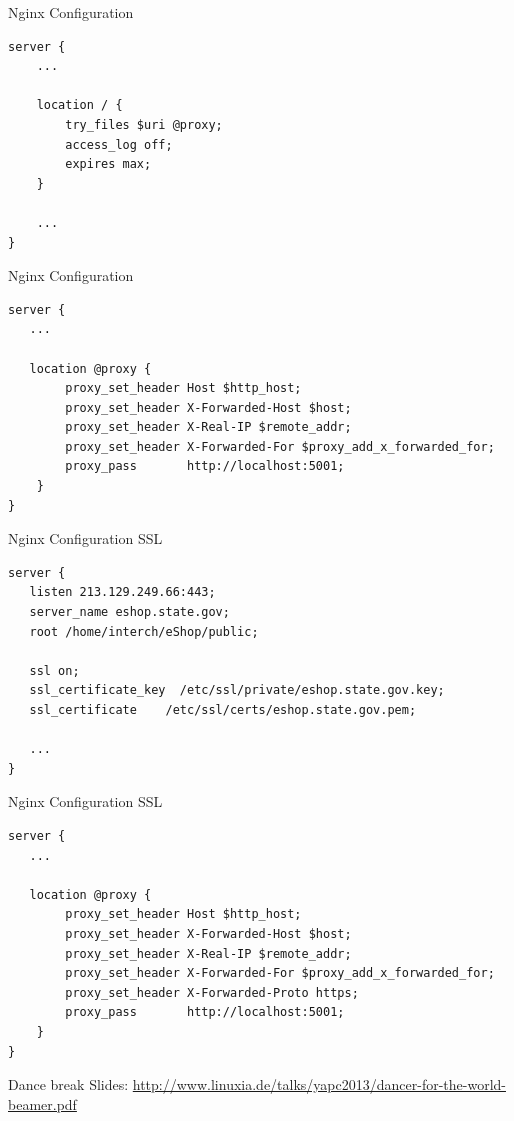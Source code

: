 \begin{frame}[fragile]{Nginx Configuration}
\begin{lstlisting}
server {
    ...

    location / {
        try_files $uri @proxy;
        access_log off;
        expires max;
    }

    ...
}
\end{lstlisting}
\end{frame}

\begin{frame}[fragile]{Nginx Configuration}
\begin{lstlisting}
server {
   ...

   location @proxy {
        proxy_set_header Host $http_host;
        proxy_set_header X-Forwarded-Host $host;
        proxy_set_header X-Real-IP $remote_addr;
        proxy_set_header X-Forwarded-For $proxy_add_x_forwarded_for;
        proxy_pass       http://localhost:5001;
    }
}
\end{lstlisting}
\end{frame}

\begin{frame}[fragile]{Nginx Configuration SSL}
\begin{lstlisting}
server {
   listen 213.129.249.66:443;
   server_name eshop.state.gov;
   root /home/interch/eShop/public;

   ssl on;
   ssl_certificate_key  /etc/ssl/private/eshop.state.gov.key;
   ssl_certificate    /etc/ssl/certs/eshop.state.gov.pem;

   ...
}
\end{lstlisting}
\end{frame}

\begin{frame}[fragile]{Nginx Configuration SSL}
\begin{lstlisting}
server {
   ...

   location @proxy {
        proxy_set_header Host $http_host;
        proxy_set_header X-Forwarded-Host $host;
        proxy_set_header X-Real-IP $remote_addr;
        proxy_set_header X-Forwarded-For $proxy_add_x_forwarded_for;
        proxy_set_header X-Forwarded-Proto https;
        proxy_pass       http://localhost:5001;
    }
}
\end{lstlisting}
\end{frame}

\begin{frame}{Dance break}
Slides:
\url{http://www.linuxia.de/talks/yapc2013/dancer-for-the-world-beamer.pdf}
\end{frame}



